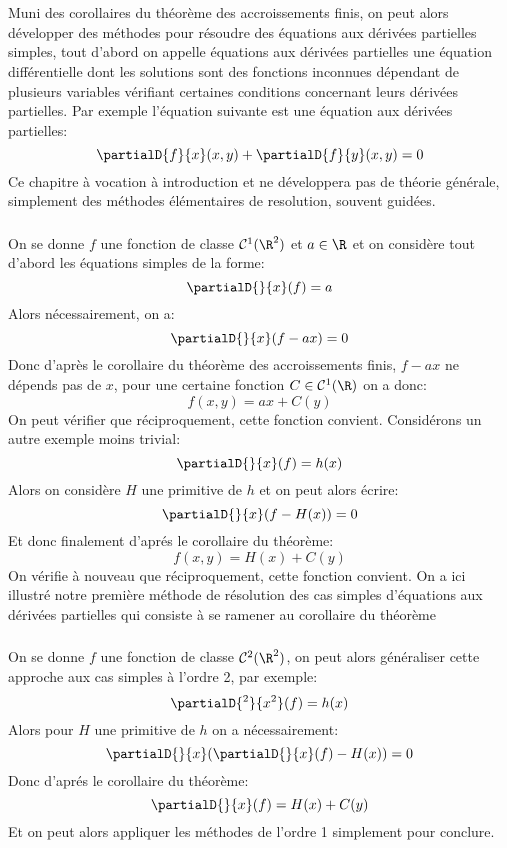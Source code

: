 \chapter*{} %
Muni des corollaires du théorème des accroissements finis, on peut alors développer des méthodes pour résoudre des équations aux dérivées partielles simples, tout d'abord on appelle équations aux dérivées partielles une équation différentielle dont les solutions sont des fonctions inconnues dépendant de plusieurs variables vérifiant certaines conditions concernant leurs dérivées partielles. Par exemple l'équation suivante est une équation aux dérivées partielles:
\[
   \partialD{f}{x}(x, y) + \partialD{f}{y}(x, y) = 0   
\]
Ce chapitre à vocation à introduction et ne développera pas de théorie générale, simplement des méthodes élémentaires de resolution, souvent guidées. 
\subsection*{}
On se donne \(f\) une fonction de classe \(\mathcal{C}^1(\R^2)\) et \(a \in \R\) et on considère tout d'abord les équations simples de la forme:
\[
   \partialD{}{x}(f) = a 
\]
Alors nécessairement, on a:
\[
   \partialD{}{x}(f - ax) = 0 
\]
Donc d'après le corollaire du théorème des accroissements finis, \(f - ax\) ne dépends pas de \(x\), pour une certaine fonction \(C \in \mathcal{C}^1(\R)\) on a donc:
\[
   f(x, y) = ax + C(y)
\]
On peut vérifier que réciproquement, cette fonction convient. Considérons un autre exemple moins trivial:
\[
   \partialD{}{x}(f) = h(x)   
\]
Alors on considère \(H\) une primitive de \(h\) et on peut alors écrire:
\[
   \partialD{}{x}(f - H(x)) = 0
\]
Et donc finalement d'aprés le corollaire du théorème:
\[
   f(x, y) = H(x) + C(y) 
\]
On vérifie à nouveau que réciproquement, cette fonction convient. On a ici illustré notre première méthode de résolution des cas simples d'équations aux dérivées partielles qui consiste à se ramener au corollaire du théorème
\subsection*{}
On se donne \(f\) une fonction de classe \(\mathcal{C}^2(\R^2)\), on peut alors généraliser cette approche aux cas simples à l'ordre 2, par exemple:
\[
   \partialD{{}^2}{x^2}(f) = h(x)   
\]
Alors pour \(H\) une primitive de \(h\) on a nécessairement:
\[
   \partialD{}{x}(\partialD{}{x}(f) - H(x)) = 0 
\]
Donc d'aprés le corollaire du théorème:
\[
   \partialD{}{x}(f) = H(x) + C(y)
\]
Et on peut alors appliquer les méthodes de l'ordre 1 simplement pour conclure.

